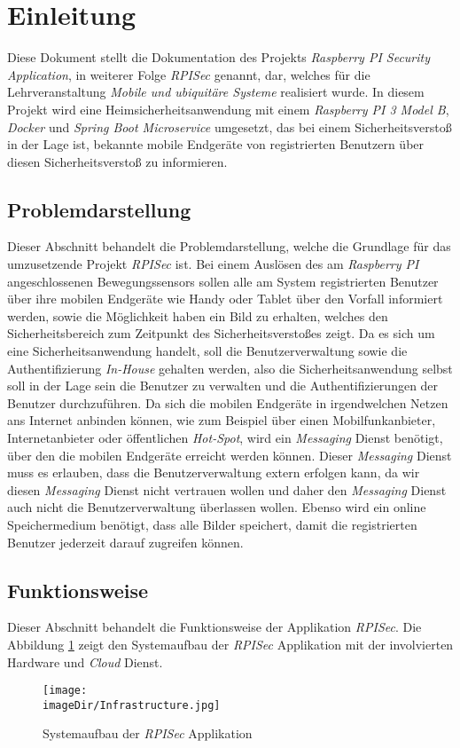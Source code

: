 \section{Einleitung}
Diese Dokument stellt die Dokumentation des Projekts \emph{Raspberry PI Security Application}, in weiterer Folge \emph{RPISec} genannt, dar, welches für die Lehrveranstaltung \emph{Mobile und ubiquitäre Systeme} realisiert wurde. In diesem Projekt wird eine Heimsicherheitsanwendung mit einem \emph{Raspberry PI 3 Model B}, \emph{Docker} und \emph{Spring Boot Microservice} umgesetzt, das bei einem Sicherheitsverstoß in der Lage ist, bekannte mobile Endgeräte von registrierten Benutzern über diesen Sicherheitsverstoß zu informieren. 

\subsection{Problemdarstellung}
Dieser Abschnitt behandelt die Problemdarstellung, welche die Grundlage für das umzusetzende Projekt \emph{RPISec} ist. Bei einem Auslösen des am \emph{Raspberry PI} angeschlossenen Bewegungssensors sollen alle am System registrierten Benutzer über ihre mobilen Endgeräte wie Handy oder Tablet über den Vorfall informiert werden, sowie die Möglichkeit haben ein Bild zu erhalten, welches den Sicherheitsbereich zum Zeitpunkt des Sicherheitsverstoßes zeigt. 
\newline
\newline
Da es sich um eine Sicherheitsanwendung handelt, soll die Benutzerverwaltung sowie die Authentifizierung \emph{In-House} gehalten werden, also die Sicherheitsanwendung selbst soll in der Lage sein die Benutzer zu verwalten und die Authentifizierungen der Benutzer durchzuführen. Da sich die mobilen Endgeräte in irgendwelchen Netzen ans Internet anbinden können, wie zum Beispiel über einen Mobilfunkanbieter, Internetanbieter oder öffentlichen \emph{Hot-Spot}, wird ein \emph{Messaging} Dienst benötigt, über den die mobilen Endgeräte erreicht werden können. Dieser \emph{Messaging} Dienst muss es erlauben, dass die Benutzerverwaltung extern erfolgen kann, da wir diesen \emph{Messaging} Dienst nicht vertrauen wollen und daher den \emph{Messaging} Dienst auch nicht die Benutzerverwaltung überlassen wollen. Ebenso wird ein online Speichermedium benötigt, dass alle Bilder speichert, damit die registrierten Benutzer jederzeit darauf zugreifen können.


\subsection{Funktionsweise}
Dieser Abschnitt behandelt die Funktionsweise der Applikation \emph{RPISec}. Die Abbildung \ref{fig:image-system-structure} zeigt den Systemaufbau der \emph{RPISec} Applikation mit der involvierten Hardware und \emph{Cloud} Dienst. 
\begin{figure}[h]
	\centering
	\texttt{[image: \\imageDir/Infrastructure.jpg]}
	\caption{Systemaufbau der \emph{RPISec} Applikation}
	\label{fig:image-system-structure}
\end{figure}
\ \newpage

